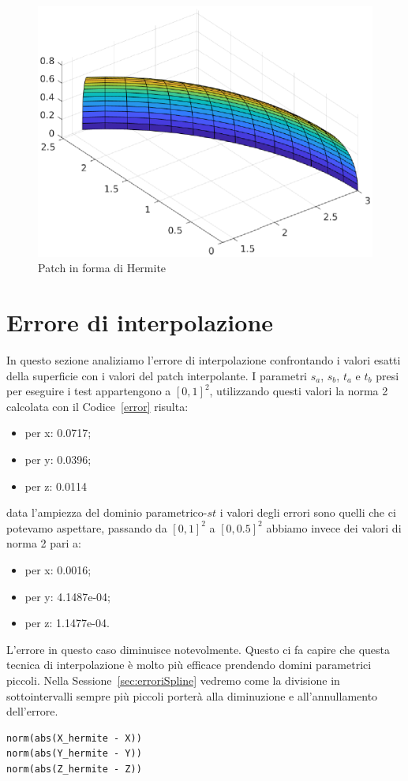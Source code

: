 \documentclass[12pt]{article}
\begin{document}
\begin{figure}[H]
    \centering

    \includegraphics[scale=0.7]{img/hermitePatch.eps}

    \caption{Patch in forma di Hermite}\label{fig:4}
\end{figure}


\section{Errore di interpolazione}
\label{sec:errori}
In questo sezione analiziamo l'errore di interpolazione confrontando i valori esatti della superficie con i valori del patch interpolante. 
I parametri $s_a$, $s_b$, $t_a$ e $t_b$ presi per eseguire
i test appartengono a $[0,1]^2$, utilizzando questi valori la norma 2 calcolata con il Codice~\ref{error}
risulta:
\begin{itemize}[-]
	\item per x: 0.0717;
	\item per y: 0.0396;
	\item per z: 0.0114
\end{itemize}
data l'ampiezza del dominio parametrico-$st$ i valori degli errori sono quelli che ci potevamo aspettare,
passando da $[0,1]^2$ a $[0,0.5]^2$ abbiamo invece dei valori di norma 2 pari a:
\begin{itemize}[-]
	\item per x: 0.0016;
	\item per y: 4.1487e-04;
	\item per z: 1.1477e-04.
\end{itemize}
L'errore in questo caso diminuisce notevolmente.
Questo ci fa capire che questa tecnica di interpolazione è molto più efficace prendendo domini
parametrici piccoli. Nella Sessione~\ref{sec:erroriSpline} vedremo come la divisione in sottointervalli 
sempre più piccoli porterà alla diminuzione e all'annullamento dell'errore.
\begin{lstlisting}[caption={Norma 2}, style=matlab, label={error}, captionpos=b]
norm(abs(X_hermite - X))
norm(abs(Y_hermite - Y))
norm(abs(Z_hermite - Z))
\end{lstlisting}
\end{document}
